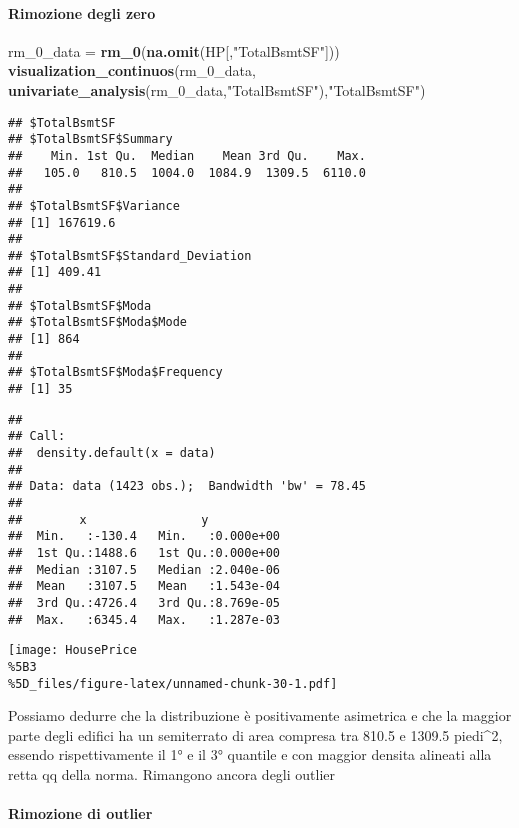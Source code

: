 \documentclass[
]{article}
\newenvironment{Shaded}{\begin{snugshade}}{\end{snugshade}}
\newcommand{\FunctionTok}[1]{\textcolor[rgb]{0.13,0.29,0.53}{\textbf{#1}}}
\newcommand{\NormalTok}[1]{#1}
\newcommand{\OtherTok}[1]{\textcolor[rgb]{0.56,0.35,0.01}{#1}}
\newcommand{\StringTok}[1]{\textcolor[rgb]{0.31,0.60,0.02}{#1}}
\begin{document}
\paragraph{Rimozione degli zero}\label{rimozione-degli-zero-5}

\begin{Shaded}
\begin{Highlighting}[]
\NormalTok{rm\_0\_data }\OtherTok{=} \FunctionTok{rm\_0}\NormalTok{(}\FunctionTok{na.omit}\NormalTok{(HP[,}\StringTok{"TotalBsmtSF"}\NormalTok{]))}
\FunctionTok{visualization\_continuos}\NormalTok{(rm\_0\_data, }\FunctionTok{univariate\_analysis}\NormalTok{(rm\_0\_data,}\StringTok{"TotalBsmtSF"}\NormalTok{),}\StringTok{"TotalBsmtSF"}\NormalTok{)}
\end{Highlighting}
\end{Shaded}

\begin{verbatim}
## $TotalBsmtSF
## $TotalBsmtSF$Summary
##    Min. 1st Qu.  Median    Mean 3rd Qu.    Max. 
##   105.0   810.5  1004.0  1084.9  1309.5  6110.0 
## 
## $TotalBsmtSF$Variance
## [1] 167619.6
## 
## $TotalBsmtSF$Standard_Deviation
## [1] 409.41
## 
## $TotalBsmtSF$Moda
## $TotalBsmtSF$Moda$Mode
## [1] 864
## 
## $TotalBsmtSF$Moda$Frequency
## [1] 35
\end{verbatim}

\begin{verbatim}
## 
## Call:
##  density.default(x = data)
## 
## Data: data (1423 obs.);  Bandwidth 'bw' = 78.45
## 
##        x                y            
##  Min.   :-130.4   Min.   :0.000e+00  
##  1st Qu.:1488.6   1st Qu.:0.000e+00  
##  Median :3107.5   Median :2.040e-06  
##  Mean   :3107.5   Mean   :1.543e-04  
##  3rd Qu.:4726.4   3rd Qu.:8.769e-05  
##  Max.   :6345.4   Max.   :1.287e-03
\end{verbatim}

\texttt{[image: HousePrice\\\%5B3\\\%5D\_files/figure-latex/unnamed-chunk-30-1.pdf]}

Possiamo dedurre che la distribuzione è positivamente asimetrica e che
la maggior parte degli edifici ha un semiterrato di area compresa tra
810.5 e 1309.5 piedi\^{}2, essendo rispettivamente il 1° e il 3°
quantile e con maggior densita alineati alla retta qq della norma.
Rimangono ancora degli outlier

\paragraph{Rimozione di outlier}\label{rimozione-di-outlier-5}
\end{document}
